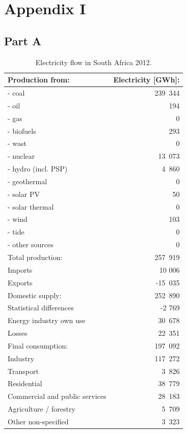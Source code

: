 \chapter{Appendix I}
\section{Part A}
\begin{table}[h] %
\centering
\begin{tabular}{| l | r |}\hline
Production from: & Electricity [GWh]:\\\hline
- coal & 239~344 \\
- oil & 194 \\
- gas & 0 \\
- biofuels & 293 \\
- wast & 0 \\
- nuclear & 13~073 \\
- hydro (incl. PSP) & 4~860 \\
- geothermal & 0 \\
- solar PV & 50 \\
- solar thermal & 0 \\
- wind & 103 \\
- tide & 0 \\
- other sources & 0 \\\hline
Total production: & 257~919 \\\hline
Imports & 10 006 \\
Exports & -15~035 \\\hline
Domestic supply: & 252~890 \\\hline
Statistical differences & -2 769 \\
Energy industry own use & 30~678 \\
Losses & 22~351 \\\hline
Final consumption: & 197~092\\\hline
Industry & 117~272 \\
Transport & 3~826 \\
Residential & 38~779\\
Commercial and public services & 28~183 \\
Agriculture / forestry  & 5~709 \\
Other non-specified & 3~323 \\\hline
\end{tabular}
\caption[Electricity flow in South Africa 2012.]{Electricity flow in South Africa 2012\cite{Agency2015}.}\label{tab1}
\end{table}
